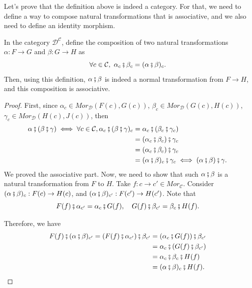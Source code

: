 Let's prove that the definition above is indeed a category.
For that, we need to define a way to compose natural transformations that
is associative, and we also need to define an identity morphism.

\begin{proposition}
  In the category $\mathcal D^{\mathcal C}$, define the composition of two natural
  transformations $\alpha:F\to G$ and $\beta:G\to H$ as
  \begin{displaymath}
    \forall c \in \mathcal C, \ \alpha_c \fatsemi \beta_c = (\alpha \fatsemi \beta)_c.
  \end{displaymath}
  Then, using this definition, $\alpha \fatsemi \beta$ is indeed a normal transformation
  from $F \to H$, and this composition is associative.
\end{proposition}
\begin{proof}
  First, since
  $\alpha_c \in Mor_\mathcal D (F(c),G(c))$,
  $\beta_c \in Mor_\mathcal D (G(c),H(c))$,
  $\gamma_c \in Mor_\mathcal D (H(c),J(c))$,
  then
  \begin{align*}
    \alpha \fatsemi (\beta \fatsemi \gamma) \iff 
    \forall c \in \mathcal C, \alpha_c \fatsemi (\beta \fatsemi \gamma)_c &=
    \alpha_c \fatsemi (\beta_c \fatsemi \gamma_c)\\&=
    (\alpha_c \fatsemi \beta_c) \fatsemi \gamma_c \\&= 
    (\alpha_c \fatsemi \beta_c) \fatsemi \gamma_c \\&= 
    (\alpha \fatsemi \beta)_c \fatsemi \gamma_c
    \iff (\alpha \fatsemi \beta) \fatsemi \gamma.
  \end{align*}
  We proved the associative part. Now, we need to show that such $\alpha \fatsemi \beta$
  is a natural transformation from $F$ to $H$. Take $f:c\to c' \in Mor_\mathcal C$.
  Consider $(\alpha \fatsemi \beta)_{c}:F(c) \to H(c)$, and
  $(\alpha\fatsemi \beta)_{c'}:F(c') \to H(c')$. Note that
  \begin{displaymath}
    F(f) \fatsemi \alpha_{c'} = \alpha_{c} \fatsemi G(f), \quad
    G(f) \fatsemi \beta_{c'} = \beta_{c} \fatsemi H(f).
  \end{displaymath}

  Therefore, we have
  \begin{align*}
    F(f) \fatsemi (\alpha\fatsemi \beta)_{c'} =
    (F(f) \fatsemi \alpha_{c'}) \fatsemi \beta_{c'} &=
    (\alpha_c \fatsemi G(f)) \fatsemi \beta_{c'} \\&=
    \alpha_c \fatsemi (G(f) \fatsemi \beta_{c'}) \\&=
    \alpha_c \fatsemi \beta_c \fatsemi H(f)\\&=
    (\alpha \fatsemi \beta)_c \fatsemi H(f).
  \end{align*}
\end{proof}

